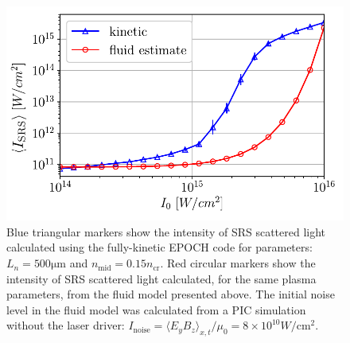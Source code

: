 \begin{figure}[ht]
    \centering
    \includegraphics[width=0.8\columnwidth]{Chapters/C4_iSRS/fig2.pdf}
    \caption{
        Blue triangular markers show the intensity of SRS scattered light calculated using the fully-kinetic EPOCH code for parameters: $L_n = 500 \si{\micro\metre} $ and $n_{\mathrm{mid}} = 0.15n_\mathrm{cr}$.
        Red circular markers show the intensity of SRS scattered light calculated, for the same plasma parameters, from the fluid model presented above.
        The initial noise level in the fluid model was calculated from a PIC simulation without the laser driver: $I_\mathrm{noise}=\langle E_yB_z\rangle_{x,t} / \mu_0 = 8\times 10^{10} \si{W/\centi\metre^2}$.}
    \label{fig:kineticVsfluid}
\end{figure}{}

